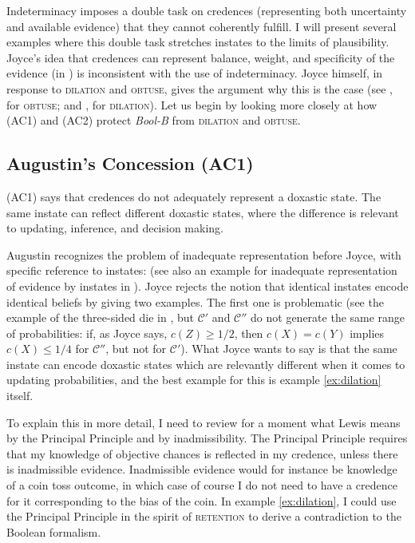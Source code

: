 \documentclass[11pt]{article}
\newcommand{\augustin}[0]{\textit{Bool-B}}
\begin{document}
Indeterminacy imposes a double task on credences (representing both
uncertainty and available evidence) that they cannot coherently
fulfill. I will present several examples where this double task
stretches instates to the limits of plausibility. Joyce's idea that
credences can represent balance, weight, and specificity of the
evidence (in ) is inconsistent with the use of
indeterminacy. Joyce himself, in response to \textsc{dilation} and
\textsc{obtuse}, gives the argument why this is the case (see
, for \textsc{obtuse}; and
, for \textsc{dilation}). Let us
begin by looking more closely at how (AC1) and (AC2) protect
{\augustin} from \textsc{dilation} and \textsc{obtuse}.

\subsection{Augustin's Concession (AC1)}
\label{jj1}

(AC1) says that credences do not adequately represent a doxastic
state. The same instate can reflect different doxastic states, where
the difference is relevant to updating, inference, and decision
making.

Augustin recognizes the problem of inadequate representation before
Joyce, with specific reference to instates:   (see also an example for
inadequate representation of evidence by instates in
). Joyce rejects the notion that
identical instates encode identical beliefs by giving two examples.
The first one is problematic (see the example of the three-sided die
in , but $\mathcal{C}'$ and $\mathcal{C}''$ do
not generate the same range of probabilities: if, as Joyce says,
$c(Z)\geq1/2$, then $c(X)=c(Y)$ implies $c(X)\leq{}1/4$ for
$\mathcal{C}''$, but not for $\mathcal{C}'$). What Joyce wants
to say is that the same instate can encode doxastic states which are
relevantly different when it comes to updating probabilities, and the
best example for this is example \ref{ex:dilation} itself.

To explain this in more detail, I need to review for a moment what
Lewis means by the Principal Principle and by inadmissibility. The
Principal Principle requires that my knowledge of objective chances is
reflected in my credence, unless there is inadmissible evidence.
Inadmissible evidence would for instance be knowledge of a coin toss
outcome, in which case of course I do not need to have a credence for
it corresponding to the bias of the coin. In example
\ref{ex:dilation}, I could use the Principal Principle in the spirit
of \textsc{retention} to derive a contradiction to the Boolean
formalism.
\end{document}
